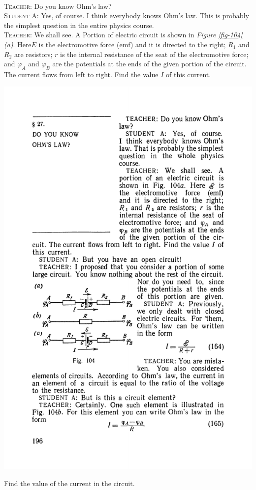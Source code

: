 \documentclass[a4paper,sfsidenotes]{tufte-book}
\begin{document}
\paragraph{}
\textsc{Teacher:} Do you know Ohm's law?
\\
\textsc{Student A:} Yes, of course. I think everybody knows Ohm's law. This is probably the simplest question in the entire physics course.
\\
\textsc{Teacher:} We shall see. A Portion of electric circuit is shown in  \emph{Figure \ref{fig-104}(a)}. Here$E$ is the electromotive force (emf) and it is directed to the right; $R_{1}$ and $R_{2}$ are resistors; $r$ is the internal resistance of the seat of the electromotive force; and $\varphi_{A}$ and $\varphi_{B}$ are the potentials at the ends of the given portion of the circuit. The current flows from left to right. Find the value $I$ of this current. 
\\
\begin{marginfigure}%
\centering
\includegraphics[width=\linewidth]{fig-104a}
\caption{Find the value of the current in the circuit.}
\label{fig-104}
\end{marginfigure}
\end{document}
